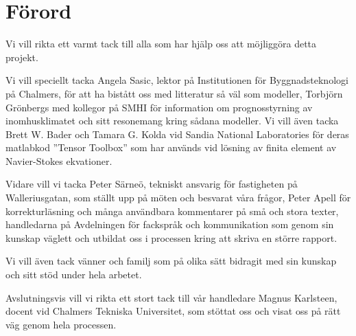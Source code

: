 \chapter*{Förord}


Vi vill rikta ett varmt tack till alla som har hjälp oss att möjliggöra detta projekt. 

Vi vill speciellt tacka Angela Sasic, lektor på Institutionen för Byggnadsteknologi på Chalmers, för att ha bistått oss med litteratur så väl som modeller, Torbjörn Grönbergs med kollegor på SMHI för information om prognosstyrning av inomhusklimatet och sitt resonemang kring sådana modeller. Vi vill även tacka Brett W. Bader och Tamara G. Kolda vid Sandia National Laboratories för deras matlabkod ''Tensor Toolbox'' som har används vid lösning av finita element av Navier-Stokes ekvationer.

Vidare vill vi tacka Peter Särneö, tekniskt ansvarig för fastigheten på Walleriusgatan, som ställt upp på möten och besvarat våra frågor, Peter Apell för korrekturläsning och många användbara kommentarer på små och stora texter, handledarna på Avdelningen för fackspråk och kommunikation som genom sin kunskap väglett och utbildat oss i processen kring att skriva en större rapport.

Vi vill även tack vänner och familj som på olika sätt bidragit med sin kunskap och sitt stöd under hela arbetet.

Avslutningsvis vill vi rikta ett stort tack till vår handledare Magnus Karlsteen, docent vid Chalmers Tekniska Universitet, som stöttat oss och visat oss på rätt väg genom hela processen.


